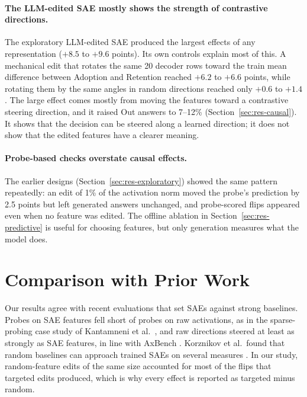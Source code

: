 \paragraph{The LLM-edited SAE mostly shows the strength of contrastive
directions.} The exploratory LLM-edited SAE produced the largest effects of
any representation ($+8.5$ to $+9.6$ points). Its own controls explain most
of this. A mechanical edit that rotates the same 20 decoder rows toward the
train mean difference between Adoption and Retention reached $+6.2$ to $+6.6$
points, while rotating them by the same angles in random directions reached
only $+0.6$ to $+1.4$.
The large effect comes mostly from moving the features toward a contrastive
steering direction, and it raised Out answers to 7--12\%
(Section~\ref{sec:res-causal}). It shows that the decision can be steered
along a learned direction; it does not show that the edited features have a
clearer meaning.

\paragraph{Probe-based checks overstate causal effects.} The earlier designs
(Section~\ref{sec:res-exploratory}) showed the same pattern repeatedly: an
edit of 1\% of the activation norm moved the probe's prediction by 2.5 points
but left generated answers unchanged, and probe-scored flips appeared even
when no feature was edited. The offline ablation in
Section~\ref{sec:res-predictive} is useful for choosing features, but only
generation measures what the model does.

\section{Comparison with Prior Work}

Our results agree with recent evaluations that set SAEs against strong
baselines. Probes on SAE features fell short of probes on raw activations, as
in the sparse-probing case study of Kantamneni et al.\
\cite{kantamneni2025useful}, and raw directions steered at least as strongly
as SAE features, in line with AxBench \cite{wu2025axbench}. Korznikov et al.\
found that random baselines can approach trained SAEs on several measures
\cite{korznikov2026sanity}. In our study, random-feature edits of the same
size accounted for most of the flips that targeted edits produced, which is
why every effect is reported as targeted minus random.


